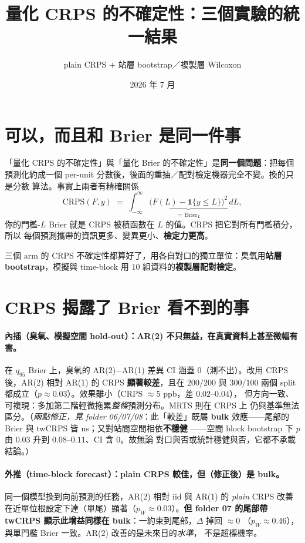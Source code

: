 \documentclass[12pt]{article}
\title{\textbf{量化 CRPS 的不確定性：三個實驗的統一結果}}
\author{plain CRPS $+$ 站層 bootstrap／複製層 Wilcoxon}
\date{2026 年 7 月}
\begin{document}
\maketitle

\section*{可以，而且和 Brier 是同一件事}

「量化 CRPS 的不確定性」與「量化 Brier 的不確定性」是\textbf{同一個問題}：把每個
預測化約成一個 per-unit 分數後，後面的重抽／配對檢定機器完全不變。換的只是分數
算法。事實上兩者有精確關係
\[
  \mathrm{CRPS}(F,y) \;=\; \int_{-\infty}^{\infty}
  \underbrace{\bigl(F(L) - \mathbf{1}\{y\le L\}\bigr)^2}_{=\,\mathrm{Brier}_L}\, dL ,
\]
你的門檻-$L$ Brier 就是 CRPS 被積函數在 $L$ 的值。CRPS 把它對所有門檻積分，所以
每個預測攜帶的資訊更多、變異更小、\textbf{檢定力更高}。

三個 arm 的 CRPS 不確定性都算好了，用各自對口的獨立單位：臭氧用\textbf{站層
bootstrap}，模擬與 time-block 用 $10$ 組資料的\textbf{複製層配對檢定}。

\bigskip


\section*{CRPS 揭露了 Brier 看不到的事}

\paragraph{內插（臭氧、模擬空間 hold-out）：AR(2) 不只無益，在真實資料上甚至微幅有害。}
在 $q_{95}$ Brier 上，臭氧的 AR(2)$-$AR(1) 差異 CI 涵蓋 $0$（測不出）。改用 CRPS
後，AR(2) 相對 AR(1) 的 CRPS \textbf{顯著較差}，且在 $200/200$ 與 $300/100$ 兩個
split 都成立（$p\approx0.03$）。效果雖小（CRPS $\approx 5$ ppb，差 $0.02$--$0.04$），
但方向一致、可複現：多加第二階輕微拖累\emph{整條}預測分布。MRTS 則在 CRPS 上
仍與基準無法區分。（\emph{兩點修正，見 folder 06/07/08}：此「較差」既屬
\textbf{bulk} 效應——尾部的 Brier 與 twCRPS 皆 ns；又對站間空間相依\textbf{不穩健}
——空間 block bootstrap 下 $p$ 由 $0.03$ 升到 $0.08$--$0.11$、CI 含 $0$。故無論
對口與否或統計穩健與否，它都不承載結論。）

\paragraph{外推（time-block forecast）：plain CRPS 較佳，但（修正後）是 bulk。}
同一個模型換到向前預測的任務，AR(2) 相對 iid 與 AR(1) 的 \emph{plain} CRPS 改善
在近單位根設定下達（單尾）顯著（$p_W\approx0.03$）。\textbf{但 folder 07 的尾部帶
twCRPS 顯示此增益同樣在 bulk}：一約束到尾部，$\Delta$ 掉回 $\approx0$
（$p_W\approx0.46$），與單門檻 Brier 一致。AR(2) 改善的是未來日的\emph{水準}，
不是超標機率。
\end{document}
